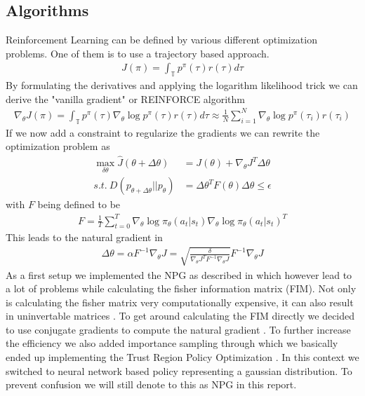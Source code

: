 \subsection{Algorithms}
\label{algos}
Reinforcement Learning can be defined by various different optimization problems. One of them is to use a trajectory based approach.
\begin{align}
  J(\pi) = \int_{\mathbb{T}} p^{\pi}(\tau) r(\tau) d\tau
\end{align}
By formulating the derivatives and applying the logarithm likelihood trick we can derive the "vanilla gradient" or REINFORCE algorithm \cite{Williams1992}
\begin{align}
  \nabla_{\theta} J(\pi) = \int_{\mathbb{T}} p^{\pi}(\tau) \nabla_{\theta} \log p^{\pi}(\tau) r(\tau) d\tau \approx \frac{1}{N} \sum_{i=1}^{N} \nabla_{\theta} \log p^{\pi}(\tau_i) r(\tau_i)
\end{align}
If we now add a constraint to regularize the gradients we can rewrite the optimization problem as
\begin{align}
  \max_{\delta\theta} \hat J(\theta + \Delta\theta) &= J(\theta) + \nabla_{\theta} J^T \Delta\theta \nonumber \\
  s.t. \ D(p_{\theta + \Delta\theta} || p_{\theta}) &= \Delta\theta^T F(\theta) \Delta\theta \leq \epsilon \label{NpgOpti}
\end{align}
with $F$ being defined to be
\begin{align}
  F = \frac{1}{T} \sum_{t=0}^{T} \nabla_{\theta} \log \pi_{\theta}(a_t | s_t)
  \nabla_{\theta} \log \pi_{\theta}(a_t | s_t)^T
\end{align}
This leads to the natural gradient in \cite{Rajeswaran2017}
\begin{align}
  \Delta \theta = \alpha F^{-1} \nabla_{\theta} J = \sqrt{\frac{\delta}{\nabla_{\theta} J^T F^{-1} \nabla_{\theta} J}} F^{-1} \nabla_{\theta} J
\end{align}
As a first setup we implemented the NPG as described in \cite{Rajeswaran2017} which however lead to a lot of problems while calculating the fisher information matrix (FIM). Not only is calculating the fisher matrix very computationally expensive, it can also result in uninvertable matrices \cite{DuanCHSA16}. To get around calculating the FIM directly we decided to use conjugate gradients to compute the natural gradient \cite{DuanCHSA16}. To further increase the efficiency we also added importance sampling through which we basically ended up implementing the Trust Region Policy Optimization \cite{SchulmanLMJA15,Telesens}. In this context we switched to neural network based policy representing a gaussian distribution. To prevent confusion we will still denote to this as NPG in this report.\\

